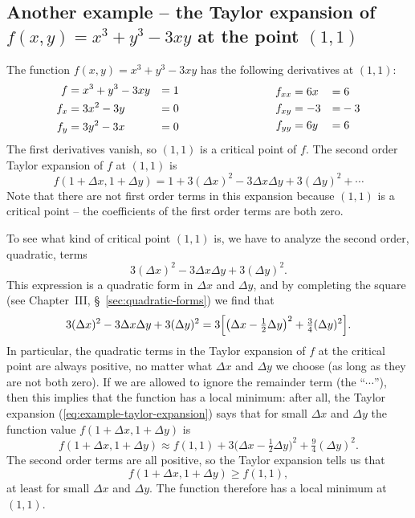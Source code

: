 \subsection{Another example -- the Taylor expansion of $f(x, y) = x^3+y^3-3xy$
  at the point $(1,1)$}
\label{sec:taylor-example-at-minimum}
The function $f(x, y) = x^3+y^3-3xy$ has the
following derivatives at $(1,1)$:
\[
\begin{aligned}
  f & =  x^3+y^3-3xy &= 1 \\
  f_x&= 3x^2 - 3y &= 0 \\
  f_y&= 3y^2-3x &= 0
\end{aligned}\hspace{0.25\textwidth}
\begin{aligned}
  f_{xx} &= 6x &=&\;6 \\ f_{xy} &=-3 &=&-3 \\ f_{yy} &= 6y &=&\;6
\end{aligned}
\]
The first derivatives vanish, so $(1,1)$ is a critical point of $f$.
The second order Taylor expansion of $f$ at $(1,1)$ is
\begin{equation}\label{eq:example-taylor-expansion}
  f(1+\Delta x, 1+\Delta y)
  = 1 + 3(\Delta x)^2 - 3\Delta x \Delta y + 3(\Delta y)^2 +\cdots
\end{equation}
Note that there are not first order terms in this expansion because $(1,1)$ is a critical point -- the coefficients of the first order terms are both zero.

To see what kind of critical point $(1,1)$ is, we have to analyze the second
order, quadratic, terms
\begin{equation}
  3(\Delta x)^2 - 3\Delta x \Delta y + 3(\Delta y)^2.
  \label{eq:example-quadratic-form}
\end{equation}
This expression is a quadratic form in $\Delta x$ and $\Delta y$, and by
completing the square (see Chapter~III, \S~\ref{sec:quadratic-forms}) we
find that
\[
3(\Delta x)^2 - 3\Delta x \Delta y + 3(\Delta y)^2
=3 \Bigl[\bigl(\Delta x - \tfrac 12 \Delta y\bigr)^2
  + \tfrac 34 (\Delta y)^2\Bigr].
\]
In particular, the quadratic terms in the Taylor expansion of $f$ at the
critical point are always positive, no matter what $\Delta x$ and $\Delta
y$ we choose (as long as they are not both zero).  If we are allowed to
ignore the remainder term (the ``$\cdots$''), then this implies that the
function has a local minimum: after all, the Taylor expansion
(\ref{eq:example-taylor-expansion}) says that for small $\Delta x$ and
$\Delta y$ the function value $f(1+\Delta x, 1+\Delta y)$ is 
\[
f(1+\Delta x, 1+\Delta y) \approx 
f(1, 1) + 3 \bigl(\Delta x - \tfrac 12 \Delta y\bigr)^2
  + \tfrac 94 (\Delta y)^2. 
\]
The second order terms are all positive, so the Taylor expansion tells us that
\[
f(1+\Delta x, 1+\Delta y) \geq f(1,1),
\]
at least for small $\Delta x$ and $\Delta y$.  The function therefore has a local minimum at $(1,1)$.

